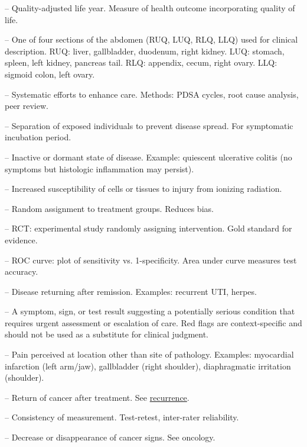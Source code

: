 -- Quality-adjusted life year. Measure of health outcome incorporating quality of life.

-- One of four sections of the abdomen (RUQ, LUQ, RLQ, LLQ) used for clinical description. RUQ: liver, gallbladder, duodenum, right kidney. LUQ: stomach, spleen, left kidney, pancreas tail. RLQ: appendix, cecum, right ovary. LLQ: sigmoid colon, left ovary.

-- Systematic efforts to enhance care. Methods: PDSA cycles, root cause analysis, peer review.

-- Separation of exposed individuals to prevent disease spread. For symptomatic incubation period.

-- Inactive or dormant state of disease. Example: quiescent ulcerative colitis (no symptoms but histologic inflammation may persist).

-- Increased susceptibility of cells or tissues to injury from ionizing radiation.

-- Random assignment to treatment groups. Reduces bias.

-- RCT: experimental study randomly assigning intervention. Gold standard for evidence.

-- ROC curve: plot of sensitivity vs. 1-specificity. Area under curve measures test accuracy.

-- Disease returning after remission. Examples: recurrent UTI, herpes.

-- A symptom, sign, or test result suggesting a potentially serious condition that requires urgent assessment or escalation of care. Red flags are context-specific and should not be used as a substitute for clinical judgment.

-- Pain perceived at location other than site of pathology. Examples: myocardial infarction (left arm/jaw), gallbladder (right shoulder), diaphragmatic irritation (shoulder).

-- Return of cancer after treatment. See \hyperlink{Recurrence}{recurrence}.

-- Consistency of measurement. Test-retest, inter-rater reliability.

-- Decrease or disappearance of cancer signs. See oncology.


